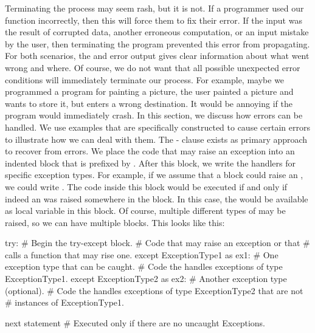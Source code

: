 Terminating the process may seem rash, but it is not.
If a programmer used our  function incorrectly, then this will force them to fix their error.
If the input  was the result of corrupted data, another erroneous computation, or an input mistake by the user, then terminating the program prevented this error from propagating.
For both scenarios, the  and error output gives clear information about what went wrong and where.%
%
\FloatBarrier%
\endhsection%
%
%
%
Of course, we do not want that all possible unexpected error conditions will immediately terminate our process.
For example, maybe we programmed a program for painting a picture, the user painted a picture and wants to store it, but enters a wrong destination.
It would be annoying if the program would immediately crash.
In this section, we discuss how errors can be handled.
We use examples that are specifically constructed to cause certain errors to illustrate how we can deal with them.%
%
%
%
The \nobreakdashes- clause exists as primary approach to recover from errors.
We place the code that may raise an exception into an indented block that is prefixed by .
After this block, we write the handlers for specific exception types.
For example, if we assume that a block could raise an , we could write .
The code inside this  block would be executed if and only if indeed an  was raised somewhere in the  block.
In this case, the  would be available as local variable  in this block.
Of course, multiple different types of  may be raised, so we can have multiple  blocks.
This looks like this:%
%
\begin{pythonSyntax}
try:  # Begin the try-except block.
    # Code that may raise an exception or that
    # calls a function that may rise one.
except ExceptionType1 as ex1:  # One exception type that can be caught.
    # Code the handles exceptions of type ExceptionType1.
except ExceptionType2 as ex2:  # Another exception type (optional).
    # Code the handles exceptions of type ExceptionType2 that are not
    # instances of ExceptionType1.

next statement  # Executed only if there are no uncaught Exceptions.
\end{pythonSyntax}
